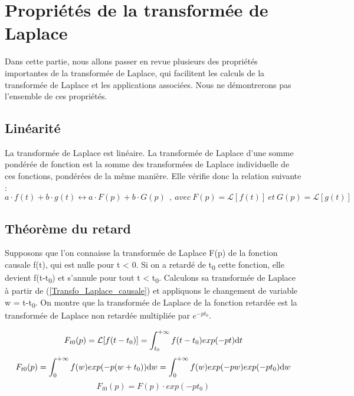 	\section{Propriétés de la transformée de Laplace}
	Dans cette partie, nous allons passer en revue plusieurs des propriétés importantes de la transformée de Laplace, qui facilitent les calculs de la transformée de Laplace et les applications associées. Nous ne démontrerons pas l'ensemble de ces propriétés.
	\subsection{Linéarité}
	La transformée de Laplace est linéaire. La transformée de Laplace d'une somme pondérée de fonction est la somme des transformées de Laplace individuelle de ces fonctions, pondérées de la même manière. Elle vérifie donc la relation suivante :
	\begin{equation}\label{key}
	a \cdot f(t)+b \cdot g(t) \longleftrightarrow a \cdot F(p)+b \cdot G(p)~~,~avec~F(p)=\mathcal{L}[f(t)]~et~G(p)=\mathcal{L}[g(t)]
	\end{equation}
	
	\subsection{Théorème du retard}
	
	Supposons que l'on connaisse la transformée de Laplace F(p) de la
	fonction causale f(t), qui est nulle pour t \textless{} 0. Si on a
	retardé de t\textsubscript{0} cette fonction, elle devient
	f(t-t\textsubscript{0}) et s'annule pour tout t \textless{}
	t\textsubscript{0}. Calculons sa transformée de Laplace à partir de (\ref{Transfo_Laplace_causale})
	et appliquons le changement de variable w = t-t\textsubscript{0}. On
	montre que la transformée de Laplace de la fonction retardée est la
	transformée de Laplace non retardée multipliée par $e^{-pt_{0}}$.
	
	\begin{equation*}
	F_{t0}(p) = \mathcal{L}[f(t-t_{0})]=\int_{t_{0}}^{+\infty}f(t-t_{0})exp(-pt) \mathrm{d} t   
	\end{equation*}
	\begin{equation*}
	F_{t0}(p) = \int_{0}^{+\infty}f(w)exp(-p(w+t_{0})) \mathrm{d} w = \int_{0}^{+\infty}f(w)exp(-pw)exp(-pt_{0}) \mathrm{d} w  
	\end{equation*}
	\begin{equation}\label{}
	F_{t0}(p) = F(p)\cdot exp(-pt_{0})
	\end{equation}
	

